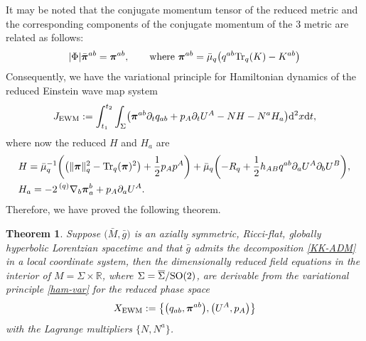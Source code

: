 \documentclass[pdftex]{sigma}
\def\ptl{\partial}%
\def\mbo#1{\boldsymbol{#1}}%
\def\olin#1{\overline{#1}{}}%
\def\grad{{\nabla}}%
\newcommand{\leftexp}[2]{{\vphantom{#2}}^{#1}{#2}}
\def\halb{\frac{1}{2}}%
\numberwithin{equation}{section}
\newtheorem{Theorem}{Theorem}[section]
\begin{document}
It may be noted that the conjugate momentum tensor of the reduced metric and the corresponding components of the conjugate momentum of the $3$ metric are related as follows:
\begin{align*}
 \vert \Phi \vert \bar{\mbo{\pi}}^{ab} = \mbo{\pi}^{ab}, \qquad \text{where} \ \mbo{\pi}^{ab} = \bar{\mu}_q \bigl(q^{ab} {\rm Tr}_q(K) - K^{ab} \bigr)
\end{align*}
Consequently, we have the variational principle for Hamiltonian dynamics of the reduced Einstein wave map system
\begin{align} \label{ham-var}
J_{{\rm EWM}} := \int^{t_2}_{t_1}\int_{\Sigma} \bigl(\mbo{\pi}^{ab} \ptl_t q_{ab} + p_A \ptl_t U^A - N H - N^a H_a \bigr) {\rm d}^2x {\rm d}t,
\end{align}
where now the reduced $H$ and $H_a$ are
\begin{align*}
&H= \bar{\mu}^{-1}_q \biggl(\bigl(\Vert \mbo{\pi} \Vert^2_q - {\rm Tr}_q (\mbo{\pi})^2 \bigr) + \halb p_A p^A \biggr) + \bar{\mu}_q \biggl(- R_q + \halb h_{AB} q^{ab} \ptl_a U^A \ptl_b U^B \biggr), \\
&H_a= - 2\, \leftexp{(q)}{\grad}_b \mbo{\pi}^b_a + p_A \ptl_a U^A.
\end{align*}
Therefore, we have proved the following theorem.

\begin{Theorem}
Suppose $\bigl(\bar{M}, \bar{g}\bigr)$ is an axially symmetric, Ricci-flat, globally hyperbolic Lorentzian spacetime and that $\bar{g}$ admits the decomposition \eqref{KK-ADM} in a local coordinate system, then the dimensionally reduced field equations in the interior of $M = \Sigma \times \mathbb{R}$, where $\Sigma = \olin{\Sigma}/{\rm SO}(2)$, are derivable from the variational principle \eqref{ham-var} for the reduced phase space
\begin{align*}
X_{{\rm EWM}} := \bigl\{ \bigl(q_{ab}, \mbo{\pi}^{ab}\bigr), \bigl(U^A, p_A\bigr) \bigr\}
\end{align*}
with the Lagrange multipliers $\{ N, N^a \}$.
\end{Theorem}
\end{document}
